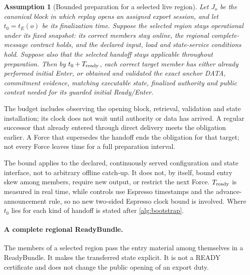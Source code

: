 \documentclass[11pt,a4paper]{article}
\newtheorem{assumption}[assumption]{Assumption}
\begin{document}
\begin{assumption}[Bounded preparation for a selected live region]
\label{ass:ready-service}
Let $J_o$ be the canonical block in which replay opens an assigned
export session, and let $t_0=t_E(o)$ be its finalization time.
Suppose the selected region stays operational under its fixed snapshot:
its correct members stay online, the regional complete-message contract
holds, and the declared input, load and state-service conditions hold.
Suppose also that the selected handoff stays applicable throughout
preparation. Then by $t_0+T_{\rm ready}$, each correct target member has
either already performed initial Enter, or obtained and validated the
exact anchor DATA, commitment evidence, matching executable state,
finalized authority and public context needed for its guarded initial
Ready/Enter.
\end{assumption}
The budget includes observing the opening block, retrieval, validation
and state installation; its clock does not wait until authority or data
has arrived. A regular successor that already entered through direct
delivery meets the obligation earlier. A Force that supersedes the
handoff ends the obligation for that target; not every Force leaves time
for a full preparation interval.

The bound applies to the declared, continuously served configuration and
state interface, not to arbitrary offline catch-up. It does not, by
itself, bound entry skew among members, require new output, or restrict
the next Force. $T_{\rm ready}$ is measured in real time, while controls
use Espresso timestamps and the advance-announcement rule, so no new
two-sided Espresso clock bound is involved. Where $t_0$ lies for each
kind of handoff is stated after \cref{alg:bootstrap}.

\paragraph{A complete regional ReadyBundle.}
\label{sec:ready-bundle}
The members of a selected region pass the entry material among themselves
in a ReadyBundle. It makes the transferred state explicit. It is not a
READY certificate and does not change the public opening of an export
duty.
\end{document}
